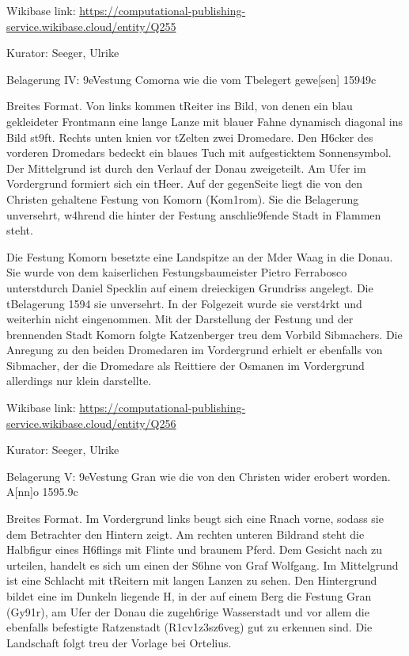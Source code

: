 \documentclass[
  letterpaper,
]{book}
\begin{document}
Wikibase link:
\url{https://computational-publishing-service.wikibase.cloud/entity/Q255}

Kurator: Seeger, Ulrike

Belagerung IV: \x9eVestung Comorna wie die vom
T\xbcrckn belegert gewe{[}sen{]} 1594\x9c

Breites Format. Von links kommen t\xbcrkische Reiter ins Bild, von
denen ein blau gekleideter Frontmann eine lange Lanze mit blauer Fahne
dynamisch diagonal ins Bild st\x9ft. Rechts unten knien vor
t\xbcrkischen Zelten zwei Dromedare. Den H\xb6cker des vorderen
Dromedars bedeckt ein blaues Tuch mit aufgesticktem Sonnensymbol. Der
Mittelgrund ist durch den Verlauf der Donau zweigeteilt. Am Ufer im
Vordergrund formiert sich ein t\xbcrkisches Heer. Auf der
gegen\xbcberliegenden Seite liegt die von den Christen gehaltene
Festung von Komorn (Kom\xa1rom). Sie \xbcberstand die Belagerung
unversehrt, w\xa4hrend die hinter der Festung anschlie\x9fende
Stadt in Flammen steht.

Die Festung Komorn besetzte eine Landspitze an der M\xbcndung der
Waag in die Donau. Sie wurde von dem kaiserlichen Festungsbaumeister
Pietro Ferrabosco unterst\xbctzt durch Daniel Specklin auf einem
dreieckigen Grundriss angelegt. Die t\xbcrkische Belagerung 1594
\xbcberstand sie unversehrt. In der Folgezeit wurde sie
verst\xa4rkt und weiterhin nicht eingenommen. Mit der Darstellung
der Festung und der brennenden Stadt Komorn folgte Katzenberger treu dem
Vorbild Sibmachers. Die Anregung zu den beiden Dromedaren im Vordergrund
erhielt er ebenfalls von Sibmacher, der die Dromedare als Reittiere der
Osmanen im Vordergrund allerdings nur klein darstellte.

Wikibase link:
\url{https://computational-publishing-service.wikibase.cloud/entity/Q256}

Kurator: Seeger, Ulrike

Belagerung V: \x9eVestung Gran wie die von den Christen wider
erobert worden. A{[}nn{]}o 1595.\x9c

Breites Format. Im Vordergrund links beugt sich eine
R\xbcckenfigur nach vorne, sodass sie dem Betrachter den Hintern
zeigt. Am rechten unteren Bildrand steht die Halbfigur eines
H\xb6flings mit Flinte und braunem Pferd. Dem Gesicht nach zu
urteilen, handelt es sich um einen der S\xb6hne von Graf Wolfgang.
Im Mittelgrund ist eine Schlacht mit t\xbcrkischen Reitern mit
langen Lanzen zu sehen. Den Hintergrund bildet eine im Dunkeln liegende
H\xbcgellandschaft, in der auf einem Berg die Festung Gran
(Gy\x91r), am Ufer der Donau die zugeh\xb6rige Wasserstadt und
vor allem die ebenfalls befestigte Ratzenstadt
(R\xa1cv\xa1z\xb3sz\xb6veg) gut zu erkennen sind. Die
Landschaft folgt treu der Vorlage bei Ortelius.
\end{document}
